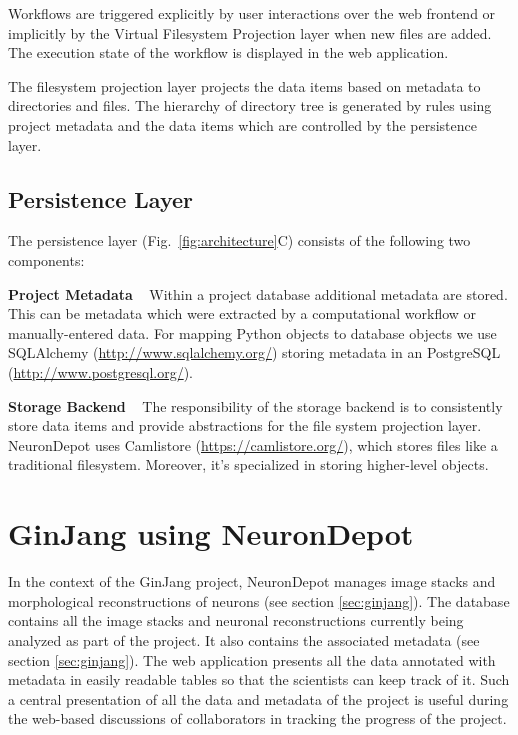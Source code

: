 \documentclass{frontiersSCNS} %
\begin{document}
Workflows are triggered explicitly by user interactions over the web
frontend or implicitly by the Virtual Filesystem Projection layer when new
files are added. The execution state of the workflow is displayed in the web
application.

The filesystem projection layer projects the data items based on metadata to
directories and files. The hierarchy of directory tree is generated by rules
using project metadata and the data items which are controlled by the
persistence layer.

\subsection{Persistence Layer}\label{sec:persistence_layer}

The persistence layer (Fig.~\ref{fig:architecture}C) consists of the following two components:

\textbf{Project Metadata} \texttt{ } Within a project database additional
metadata are stored. This can be metadata which were extracted by a computational
workflow or manually-entered data. For mapping Python objects to database
objects we use SQLAlchemy (\url{http://www.sqlalchemy.org/}) storing metadata
in an PostgreSQL (\url{http://www.postgresql.org/}).

\textbf{Storage Backend} \texttt{ } The responsibility of the storage backend
is to consistently store data items and provide abstractions for the file
system projection layer. NeuronDepot uses Camlistore
(\url{https://camlistore.org/}), which stores files like a traditional
filesystem. Moreover, it's specialized in storing higher-level objects.

\section{GinJang using NeuronDepot}

In the context of the GinJang project, NeuronDepot manages image stacks and
morphological reconstructions of neurons (see section \ref{sec:ginjang}). The
database contains all the image stacks and neuronal reconstructions currently
being analyzed as part of the project. It also contains the associated
metadata (see section \ref{sec:ginjang}). The web application presents all the
data annotated with metadata in easily readable tables so that the scientists
can keep track of it. Such a central presentation of all the data and metadata of
the project is useful during the web-based discussions of collaborators in
tracking the progress of the project.
\end{document}
